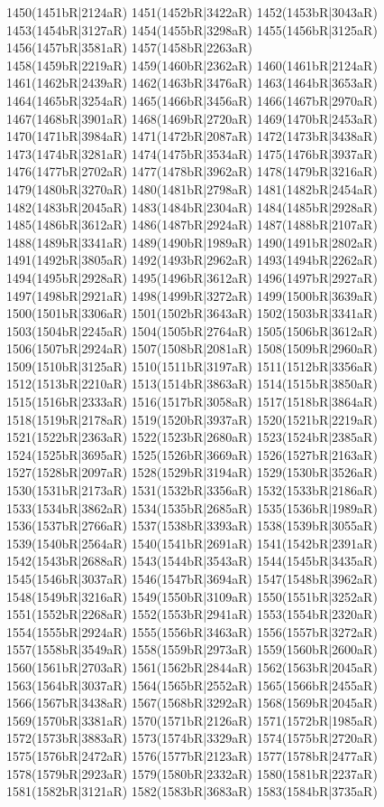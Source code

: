 1450(1451bR|2124aR) 1451(1452bR|3422aR) 1452(1453bR|3043aR) 1453(1454bR|3127aR) 1454(1455bR|3298aR) 1455(1456bR|3125aR) 1456(1457bR|3581aR) 1457(1458bR|2263aR) \\1458(1459bR|2219aR) 1459(1460bR|2362aR) 1460(1461bR|2124aR) 1461(1462bR|2439aR) 1462(1463bR|3476aR) 1463(1464bR|3653aR) 1464(1465bR|3254aR) 1465(1466bR|3456aR) 1466(1467bR|2970aR) \\1467(1468bR|3901aR) 1468(1469bR|2720aR) 1469(1470bR|2453aR) 1470(1471bR|3984aR) 1471(1472bR|2087aR) 1472(1473bR|3438aR) 1473(1474bR|3281aR) 1474(1475bR|3534aR) 1475(1476bR|3937aR) \\1476(1477bR|2702aR) 1477(1478bR|3962aR) 1478(1479bR|3216aR) 1479(1480bR|3270aR) 1480(1481bR|2798aR) 1481(1482bR|2454aR) 1482(1483bR|2045aR) 1483(1484bR|2304aR) 1484(1485bR|2928aR) \\1485(1486bR|3612aR) 1486(1487bR|2924aR) 1487(1488bR|2107aR) 1488(1489bR|3341aR) 1489(1490bR|1989aR) 1490(1491bR|2802aR) 1491(1492bR|3805aR) 1492(1493bR|2962aR) 1493(1494bR|2262aR) \\1494(1495bR|2928aR) 1495(1496bR|3612aR) 1496(1497bR|2927aR) 1497(1498bR|2921aR) 1498(1499bR|3272aR) 1499(1500bR|3639aR) 1500(1501bR|3306aR) 1501(1502bR|3643aR) 1502(1503bR|3341aR) \\1503(1504bR|2245aR) 1504(1505bR|2764aR) 1505(1506bR|3612aR) 1506(1507bR|2924aR) 1507(1508bR|2081aR) 1508(1509bR|2960aR) 1509(1510bR|3125aR) 1510(1511bR|3197aR) 1511(1512bR|3356aR) \\1512(1513bR|2210aR) 1513(1514bR|3863aR) 1514(1515bR|3850aR) 1515(1516bR|2333aR) 1516(1517bR|3058aR) 1517(1518bR|3864aR) 1518(1519bR|2178aR) 1519(1520bR|3937aR) 1520(1521bR|2219aR) \\1521(1522bR|2363aR) 1522(1523bR|2680aR) 1523(1524bR|2385aR) 1524(1525bR|3695aR) 1525(1526bR|3669aR) 1526(1527bR|2163aR) 1527(1528bR|2097aR) 1528(1529bR|3194aR) 1529(1530bR|3526aR) \\1530(1531bR|2173aR) 1531(1532bR|3356aR) 1532(1533bR|2186aR) 1533(1534bR|3862aR) 1534(1535bR|2685aR) 1535(1536bR|1989aR) 1536(1537bR|2766aR) 1537(1538bR|3393aR) 1538(1539bR|3055aR) \\1539(1540bR|2564aR) 1540(1541bR|2691aR) 1541(1542bR|2391aR) 1542(1543bR|2688aR) 1543(1544bR|3543aR) 1544(1545bR|3435aR) 1545(1546bR|3037aR) 1546(1547bR|3694aR) 1547(1548bR|3962aR) \\1548(1549bR|3216aR) 1549(1550bR|3109aR) 1550(1551bR|3252aR) 1551(1552bR|2268aR) 1552(1553bR|2941aR) 1553(1554bR|2320aR) 1554(1555bR|2924aR) 1555(1556bR|3463aR) 1556(1557bR|3272aR) \\1557(1558bR|3549aR) 1558(1559bR|2973aR) 1559(1560bR|2600aR) 1560(1561bR|2703aR) 1561(1562bR|2844aR) 1562(1563bR|2045aR) 1563(1564bR|3037aR) 1564(1565bR|2552aR) 1565(1566bR|2455aR) \\1566(1567bR|3438aR) 1567(1568bR|3292aR) 1568(1569bR|2045aR) 1569(1570bR|3381aR) 1570(1571bR|2126aR) 1571(1572bR|1985aR) 1572(1573bR|3883aR) 1573(1574bR|3329aR) 1574(1575bR|2720aR) \\1575(1576bR|2472aR) 1576(1577bR|2123aR) 1577(1578bR|2477aR) 1578(1579bR|2923aR) 1579(1580bR|2332aR) 1580(1581bR|2237aR) 1581(1582bR|3121aR) 1582(1583bR|3683aR) 1583(1584bR|3735aR) 